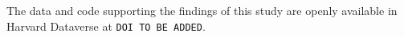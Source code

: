 The data and code supporting the findings of this study are openly available in Harvard Dataverse at \texttt{DOI TO BE ADDED}.
